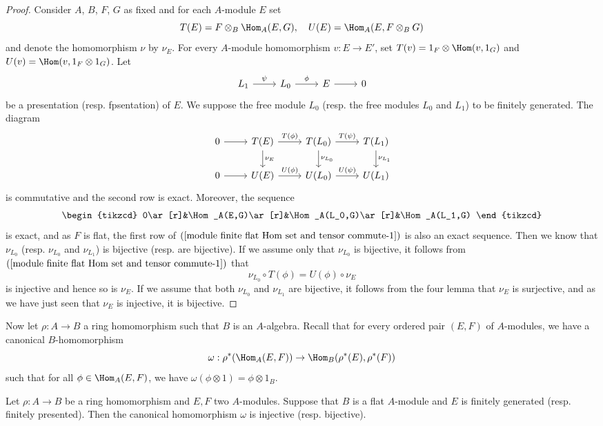 \begin{proof}
Consider $A$, $B$, $F$, $G$ as fixed and for each $A$-module $E$ set
\[T(E)=F\otimes_B\Hom_A(E,G),\quad U(E)=\Hom_A(E,F\otimes_BG)\]
and denote the homomorphism $\nu$ by $\nu_E$. For every $A$-module homomorphism $v:E\to E'$, set $T(v)=1_F\otimes\Hom(v,1_G)$ and $U(v)=\Hom(v,1_F\otimes 1_G)$. Let
\[\begin{tikzcd}
L_1\ar[r,"\psi"]&L_0\ar[r,"\phi"]&E\ar[r]&0 \end{tikzcd}\]
be a presentation (resp. fpsentation) of $E$. We suppose the free module $L_0$ (resp. the free modules $L_0$ and $L_1$) to be finitely generated. The diagram
\begin{equation}\label{module finite flat Hom set and tensor commute-1}
\begin{tikzcd}
0\ar[r]&T(E)\ar[r,"T(\phi)"]\ar[d,"\nu_E"]&T(L_0)\ar[r,"T(\psi)"]\ar[d,"\nu_{L_0}"]&T(L_1)\ar[d,"\nu_{L_1}"]\\
0\ar[r]&U(E)\ar[r,"U(\phi)"]&U(L_0)\ar[r,"U(\psi)"]&U(L_1)
\end{tikzcd}
\end{equation}
is commutative and the second row is exact. Moreover, the sequence
\[\begin{tikzcd}
0\ar[r]&\Hom_A(E,G)\ar[r]&\Hom_A(L_0,G)\ar[r]&\Hom_A(L_1,G)
\end{tikzcd}\]
is exact, and as $F$ is flat, the first row of $(\ref{module finite flat Hom set and tensor commute-1})$ is also an exact sequence. Then we know that $\nu_{L_0}$ (resp. $\nu_{L_0}$ and $\nu_{L_1}$) is bijective (resp. are bijective). If we assume only that $\nu_{L_0}$ is bijective, it follows from $(\ref{module finite flat Hom set and tensor commute-1})$ that
\[\nu_{L_0}\circ T(\phi)=U(\phi)\circ\nu_E\]
is injective and hence so is $\nu_E$. If we assume that both $\nu_{L_0}$ and $\nu_{L_1}$ are bijective, it follows from the four lemma that $\nu_E$ is surjective, and as we have just seen that $\nu_E$ is injective, it is bijective.
\end{proof}
Now let $\rho:A\to B$ a ring homomorphism such that $B$ is an $A$-algebra. Recall that for every ordered pair $(E,F)$ of $A$-modules, we have a canonical $B$-homomorphism
\[\omega:\rho^*(\Hom_A(E,F))\to\Hom_B(\rho^*(E),\rho^*(F))\]
such that for all $\phi\in\Hom_A(E,F)$, we have $\omega(\phi\otimes 1)=\phi\otimes 1_B$.
\begin{proposition}\label{module flat algebra extension of Hom}
Let $\rho:A\to B$ be a ring homomorphism and $E,F$ two $A$-modules. Suppose that $B$ is a flat $A$-module and $E$ is finitely generated (resp. finitely presented). Then the canonical homomorphism $\omega$ is injective (resp. bijective).
\end{proposition}
